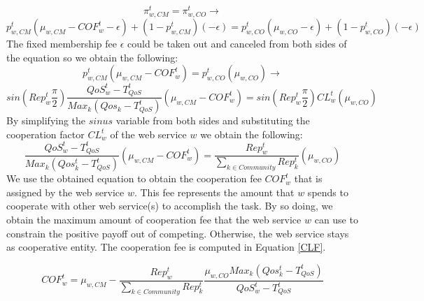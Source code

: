 \documentclass[runningheads,a4paper]{llncs}
\begin{document}
\begin{equation*}\label{equit}
\pi_{w,CM}^t=\pi_{w,CO}^t      \rightarrow
\end{equation*}
\begin{equation*}
p_{w,CM}^t(\mu_{w,CM}-COF_w^t-\epsilon)+(1-p_{w,CM}^t)(-\epsilon)=p_{w,CO}^t(\mu_{w,
CO}-\epsilon)+(1-p_{w,CO}^t)(-\epsilon)
\end{equation*}
The fixed membership fee $\epsilon$ could be taken out and
canceled from both sides of the equation so we obtain the
following:
\begin{equation*}
p_{w,CM}^t(\mu_{w,CM}-COF_w^t)=p_{w,CO}^t(\mu_{w,CO})\rightarrow
\end{equation*}
\begin{equation*}
sin(Rep^t_w\frac{\pi}{2})\frac{QoS_w^t-T_{QoS}^t}{Max_k(Qos_k-T_{QoS}^t)}(\mu_{w,
CM}-COF_w^t)=sin(Rep^t_w\frac{\pi}{2})CL_w^t(\mu_{w, CO})
\end{equation*}
By simplifying the $sinus$ variable from both sides and
substituting the cooperation factor $CL_w^t$ of the web service
$w$ we obtain the following:
\begin{equation*}
\frac{QoS_w^t-T_{QoS}^t}{Max_k(Qos_k^t-T_{QoS}^t)}(\mu_{w,CM}-COF_w^t)=\frac{Rep^t_w}{\sum_{k\in
Community}Rep^t_k}(\mu_{w, CO})
\end{equation*}
%
We use the obtained equation to obtain the cooperation fee
$COF_w^t$ that is assigned by the web service $w$. This fee
represents the amount that $w$ spends to cooperate with other web
service(s) to accomplish the task. By so doing, we obtain the
maximum amount of cooperation fee that the web service $w$ can use
to constrain the positive payoff out of competing. Otherwise, the
web service stays as cooperative entity. The cooperation fee is
computed in Equation \ref{CLF}.

\begin{equation}\label{CLF}
COF_w^t=\mu_{w,CM}-\frac{Rep^t_w}{\sum_{k\in
Community}Rep^t_k}\frac{\mu_{w,CO}Max_k(Qos_k^t-T_{QoS}^t)}{QoS_w^t-T_{QoS}^t}
\end{equation}
\end{document}
